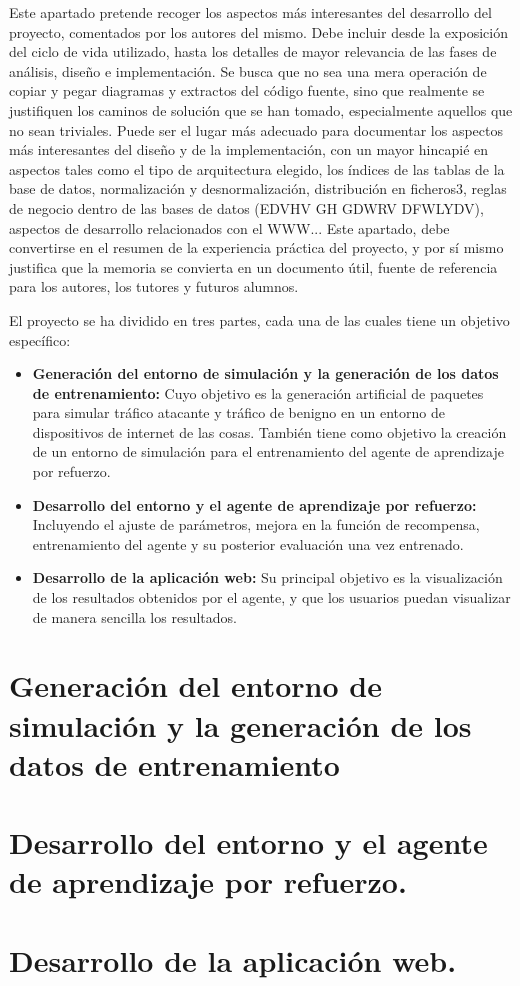 
Este apartado pretende recoger los aspectos más interesantes del desarrollo del proyecto, comentados por los autores del mismo.
Debe incluir desde la exposición del ciclo de vida utilizado, hasta los detalles de mayor relevancia de las fases de análisis, diseño e implementación.
Se busca que no sea una mera operación de copiar y pegar diagramas y extractos del código fuente, sino que realmente se justifiquen los caminos de solución que se han tomado, especialmente aquellos que no sean triviales.
Puede ser el lugar más adecuado para documentar los aspectos más interesantes del diseño y de la implementación, con un mayor hincapié en aspectos tales como el tipo de arquitectura elegido, los índices de las tablas de la base de datos, normalización y desnormalización, distribución en ficheros3, reglas de negocio dentro de las bases de datos (EDVHV GH GDWRV DFWLYDV), aspectos de desarrollo relacionados con el WWW...
Este apartado, debe convertirse en el resumen de la experiencia práctica del proyecto, y por sí mismo justifica que la memoria se convierta en un documento útil, fuente de referencia para los autores, los tutores y futuros alumnos.


El proyecto se ha dividido en tres partes, cada una de las cuales tiene un objetivo específico:
\begin{itemize}
    \item \textbf{Generación del entorno de simulación y la generación de los datos de entrenamiento:} Cuyo objetivo es la generación artificial de paquetes para simular tráfico atacante y tráfico de benigno en un entorno de dispositivos de internet de las cosas. También tiene como objetivo la creación de un entorno de simulación para el entrenamiento del agente de aprendizaje por refuerzo.
    \item \textbf{Desarrollo del entorno y el agente de aprendizaje por refuerzo:} Incluyendo el ajuste de parámetros, mejora en la función de recompensa, entrenamiento del agente y su posterior evaluación una vez entrenado.
    \item \textbf{Desarrollo de la aplicación web:} Su principal objetivo es la visualización de los resultados obtenidos por el agente, y que los usuarios puedan visualizar de manera sencilla los resultados.
\end{itemize}

\section{Generación del entorno de simulación y la generación de los datos de entrenamiento}

\section{Desarrollo del entorno y el agente de aprendizaje por refuerzo.}

\section{Desarrollo de la aplicación web.}